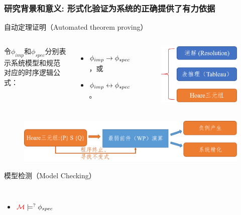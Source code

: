 \documentclass[aspectratio=1610, 9pt, CJK]{beamer}
\begin{document}
	\begin{frame}
		\frametitle{研究背景和意义: {\small 形式化验证为系统的正确提供了有力依据}} 
\begin{block}{自动定理证明（Automated theorem proving）}
		\begin{columns}
			令$\phi_{imp}$和$\phi_{spec}$分别表示系统模型和规范对应的时序逻辑公式：
			\begin{itemize}
				\item $\phi_{imp} \rightarrow \phi_{spec}$，或
				\item $\phi_{imp} \leftrightarrow \phi_{spec}$。
			\end{itemize}
			\begin{figure}
				\includegraphics[scale=0.3]{figures/atp}
			\end{figure}
		\end{columns} 
	\begin{figure}
		\includegraphics[scale=0.3]{figures/hoareTriple}
	\end{figure}
	\end{block}
\vskip 0.5pt
	\begin{block}{模型检测（Model Checking）}
		\begin{columns}
			\column{0.5\textwidth} 
			\begin{itemize}
				\item $\textcolor{red}{{\cal M}} \models^? \phi_{spec}$

\end{itemize}
\end{columns}
\end{block}
\end{frame}
\end{document}
